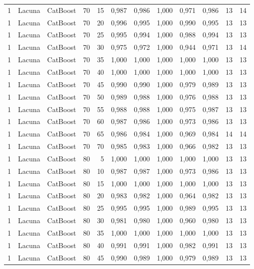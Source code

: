 \begin{longtable}{@{}rllrrrrrrrrr@{}}
1 & Lacuna & CatBoost & 70 & 15 & 0,987 & 0,986 & 1,000 & 0,971 & 0,986 & 13 & 14 \\
1 & Lacuna & CatBoost & 70 & 20 & 0,996 & 0,995 & 1,000 & 0,990 & 0,995 & 13 & 13 \\
1 & Lacuna & CatBoost & 70 & 25 & 0,995 & 0,994 & 1,000 & 0,988 & 0,994 & 13 & 13 \\
1 & Lacuna & CatBoost & 70 & 30 & 0,975 & 0,972 & 1,000 & 0,944 & 0,971 & 13 & 14 \\
1 & Lacuna & CatBoost & 70 & 35 & 1,000 & 1,000 & 1,000 & 1,000 & 1,000 & 13 & 13 \\
1 & Lacuna & CatBoost & 70 & 40 & 1,000 & 1,000 & 1,000 & 1,000 & 1,000 & 13 & 13 \\
1 & Lacuna & CatBoost & 70 & 45 & 0,990 & 0,990 & 1,000 & 0,979 & 0,989 & 13 & 13 \\
1 & Lacuna & CatBoost & 70 & 50 & 0,989 & 0,988 & 1,000 & 0,976 & 0,988 & 13 & 13 \\
1 & Lacuna & CatBoost & 70 & 55 & 0,988 & 0,988 & 1,000 & 0,975 & 0,987 & 13 & 13 \\
1 & Lacuna & CatBoost & 70 & 60 & 0,987 & 0,986 & 1,000 & 0,973 & 0,986 & 13 & 13 \\
1 & Lacuna & CatBoost & 70 & 65 & 0,986 & 0,984 & 1,000 & 0,969 & 0,984 & 14 & 14 \\
1 & Lacuna & CatBoost & 70 & 70 & 0,985 & 0,983 & 1,000 & 0,966 & 0,982 & 13 & 13 \\
1 & Lacuna & CatBoost & 80 & 5 & 1,000 & 1,000 & 1,000 & 1,000 & 1,000 & 13 & 13 \\
1 & Lacuna & CatBoost & 80 & 10 & 0,987 & 0,987 & 1,000 & 0,973 & 0,986 & 13 & 13 \\
1 & Lacuna & CatBoost & 80 & 15 & 1,000 & 1,000 & 1,000 & 1,000 & 1,000 & 13 & 13 \\
1 & Lacuna & CatBoost & 80 & 20 & 0,983 & 0,982 & 1,000 & 0,964 & 0,982 & 13 & 13 \\
1 & Lacuna & CatBoost & 80 & 25 & 0,995 & 0,995 & 1,000 & 0,989 & 0,995 & 13 & 13 \\
1 & Lacuna & CatBoost & 80 & 30 & 0,981 & 0,980 & 1,000 & 0,960 & 0,980 & 13 & 13 \\
1 & Lacuna & CatBoost & 80 & 35 & 1,000 & 1,000 & 1,000 & 1,000 & 1,000 & 13 & 13 \\
1 & Lacuna & CatBoost & 80 & 40 & 0,991 & 0,991 & 1,000 & 0,982 & 0,991 & 13 & 13 \\
1 & Lacuna & CatBoost & 80 & 45 & 0,990 & 0,989 & 1,000 & 0,979 & 0,989 & 13 & 13 \\

\end{longtable}
